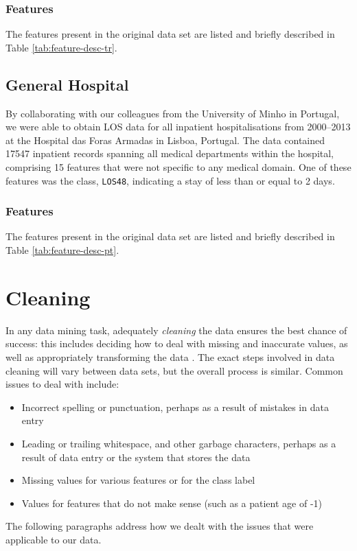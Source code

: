 \subsubsection{Features}
The features present in the original data set are listed and briefly described
in Table \ref{tab:feature-desc-tr}.

\subsection{General Hospital}
By collaborating with our colleagues from the University of Minho in Portugal,
we were able to obtain LOS data for all inpatient hospitalisations from
2000--2013 at the Hospital das Foras Armadas in Lisboa, Portugal. The data
contained 17547 inpatient records spanning all medical departments within the
hospital, comprising 15 features that were not specific to any medical domain.
One of these features was the class, \texttt{LOS48}, indicating a stay of
less than or equal to 2 days.

\subsubsection{Features}
The features present in the original data set are listed and briefly described
in Table \ref{tab:feature-desc-pt}.



\section{Cleaning} %
In any data mining task, adequately \textit{cleaning} the data ensures the best
chance of success: this includes deciding how to deal with missing and
inaccurate values, as well as appropriately transforming the data
\citep{Witten2005}.
The exact steps involved in data cleaning will vary between data
sets, but the overall process is similar. Common issues to deal with include:
\begin{itemize}
\item Incorrect spelling or punctuation, perhaps as a result of mistakes in
data entry
\item Leading or trailing whitespace, and other garbage characters,
perhaps as a result of data entry or
the system that stores the data
\item Missing values for various features or for the class label
\item Values for features that do not make sense (such as a patient age of
-1)
\end{itemize}
The following paragraphs address how we dealt with the issues that were
applicable to our data.

